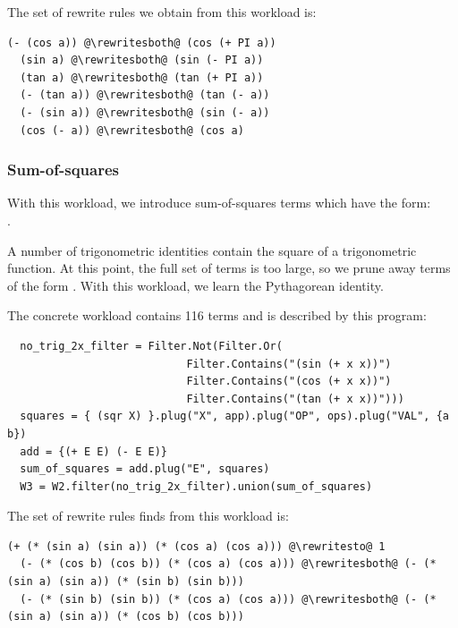 The set of rewrite rules we obtain from this workload is:
\begin{lstlisting}[escapechar=@]
  (- (cos a)) @\rewritesboth@ (cos (+ PI a))
  (sin a) @\rewritesboth@ (sin (- PI a))
  (tan a) @\rewritesboth@ (tan (+ PI a))
  (- (tan a)) @\rewritesboth@ (tan (- a))
  (- (sin a)) @\rewritesboth@ (sin (- a))
  (cos (- a)) @\rewritesboth@ (cos a)
\end{lstlisting}

\subsubsection{Sum-of-squares}
With this workload, we introduce sum-of-squares
  terms which have the form: \\
   .

A number of trigonometric identities
  contain the square of a trigonometric function.
At this point, the full set of terms is too large,
so we prune away terms of the form .
With this workload, we learn the Pythagorean identity.

The concrete workload contains 116 terms and is described by this \enumo program:

\begin{lstlisting}
  no_trig_2x_filter = Filter.Not(Filter.Or(
                            Filter.Contains("(sin (+ x x))")
                            Filter.Contains("(cos (+ x x))")
                            Filter.Contains("(tan (+ x x))")))
  squares = { (sqr X) }.plug("X", app).plug("OP", ops).plug("VAL", {a b})
  add = {(+ E E) (- E E)}
  sum_of_squares = add.plug("E", squares)
  W3 = W2.filter(no_trig_2x_filter).union(sum_of_squares)
\end{lstlisting}

The set of rewrite rules \enumo finds from this workload is:
\begin{lstlisting}[escapechar=@]
  (+ (* (sin a) (sin a)) (* (cos a) (cos a))) @\rewritesto@ 1
  (- (* (cos b) (cos b)) (* (cos a) (cos a))) @\rewritesboth@ (- (* (sin a) (sin a)) (* (sin b) (sin b)))
  (- (* (sin b) (sin b)) (* (cos a) (cos a))) @\rewritesboth@ (- (* (sin a) (sin a)) (* (cos b) (cos b)))
\end{lstlisting}

